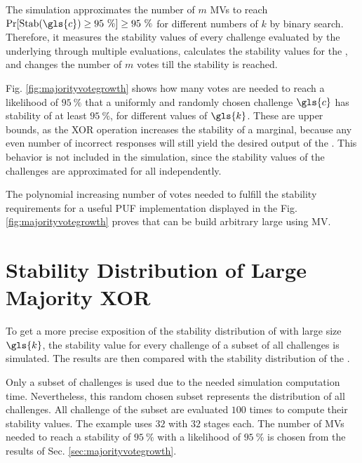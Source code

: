 The simulation approximates the number of $m$ \acp{MV} to reach $\Pr[\protect\Stab(\gls{c}) \ge 95\ \%] \ge 95\ \%$ for different numbers of $k$ by binary search.
Therefore, it measures the stability values of every challenge evaluated by the underlying \mpufs through multiple evaluations, calculates the stability values for the \mxpuf, and changes the number of $m$ votes till the stability is reached.

Fig. \ref{fig:majorityvotegrowth} shows how many votes are needed to reach a likelihood of $95\ \%$ that a uniformly and randomly chosen challenge $\gls{c}$ has stability of at least $95\ \%$, for different values of $\gls{k}$.
These are upper bounds, as the \ac{XOR} operation increases the stability of a \xpuf marginal, because any even number of incorrect \apuf responses will still yield the desired output of the \xpuf. 
This behavior is not included in the simulation, since the stability values of the challenges are approximated for all \apufs independently.

The polynomial increasing number of votes needed to fulfill the stability requirements for a useful PUF implementation displayed in the Fig. \ref{fig:majorityvotegrowth} proves that \xpufs can be build arbitrary large using \ac{MV}.


\section{Stability Distribution of Large Majority \acs{XOR} \apufs}
\label{sec:distributionoflargemxpufs}

To get a more precise exposition of the stability distribution of \mxpufs with large size $\gls{k}$, the stability value for every challenge of a subset of all challenges is simulated.
The results are then compared with the stability distribution of the \apuf.

Only a subset of challenges is used due to the needed simulation computation time.
Nevertheless, this random chosen subset represents the distribution of all challenges. 
All challenge of the subset are evaluated $100$ times to compute their stability values.
The example uses $32$ \mpufs with $32$ stages each.
The number of \acp{MV} needed to reach a stability of $95\ \%$ with a likelihood of $95\ \%$ is chosen from the results of Sec. \ref{sec:majorityvotegrowth}.

